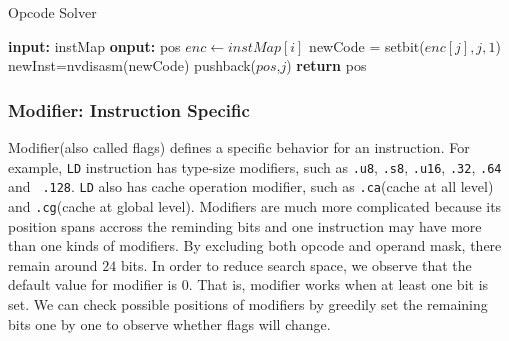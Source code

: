 \begin{algorithm}
      \caption{Opcode Solver}\label{algo:opcode}
  \begin{algorithmic}[1]
      \State \textbf {input:} instMap
      \State \textbf {onput:} pos
      \State $enc \gets instMap[i]$ 
      \State newCode = setbit($enc[j], j, 1$)
      \State newInst=nvdisasm(newCode)
      \State pushback($pos$,$j$)
      \EndIf
      \EndIf
      \EndFor
      \EndFor
      \State \textbf{return} pos
  \end{algorithmic}
\end{algorithm}

\subsubsection{Modifier: Instruction Specific}

Modifier(also called flags) defines a specific behavior for an instruction. For example,
{\tt LD} instruction has type-size modifiers, such as {\tt .u8}, {\tt .s8}, {\tt .u16}, {\tt .32}, {\tt .64} and {\tt 
.128}. {\tt LD} also has cache operation modifier, such as {\tt .ca}(cache at all level) and {\tt .cg}(cache at global 
level). Modifiers are much more complicated because its position spans accross the reminding bits and one instruction 
may have more than one kinds of modifiers. By excluding both opcode and operand mask, there remain around $24$ bits. In 
order to reduce search space, we observe that the default value for modifier is $0$. That is, modifier works when at 
least one bit is set. We can check possible positions of modifiers by greedily set the remaining bits one by one to 
observe whether flags will change.
